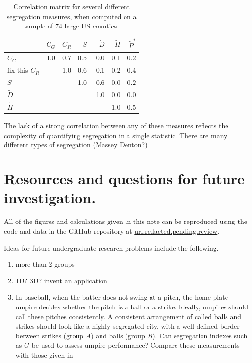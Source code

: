 \documentclass{article}
\theoremstyle{theorem}
\theoremstyle{definition}
\begin{document}
\begin{table}[b]
\centering
\begin{tabular}{l|rrrrrr} %
 & $C_G$ & $C_R$ & $S$ & $\tilde{D}$ &  $\tilde{H}$ & $\tilde{P}^*$ \\
  \hline
  $C_G$ & 1.0 & 0.7 & 0.5 & 0.0 & 0.1 & 0.2 \\ fix this
  $C_R$ &  & 1.0 & 0.6 & -0.1 & 0.2 & 0.4 \\
  $S$ &  &  & 1.0 & 0.6 &  0.0 & 0.2 \\
  $\tilde{D}$ &  &  &  & 1.0 & 0.0 & 0.0\\
  $\tilde{H}$ &  &  &  &  & 1.0 & 0.5 \\
\end{tabular}
\caption{Correlation matrix for several different segregation measures, when computed on a sample of 74 large US counties.}
\label{tab:indexcor}
\end{table}

The lack of a strong correlation between any of these measures reflects the complexity of quantifying segregation in a single statistic. There are many different types of segregation (Massey Denton?)

\section{Resources and questions for future investigation.}

All of the figures and calculations given in this note can be reproduced using the code and data in the GitHub repository at
\url{url.redacted.pending.review}.

Ideas for future undergraduate research problems include the following.

\begin{enumerate}
  \item more than 2 groups
  \item 1D? 3D? invent an application
  \item In baseball, when the batter does not swing at a pitch, the home plate umpire decides whether the pitch is a ball or a strike. Ideally, umpires should call these pitches consistently. A consistent arrangement of called balls and strikes should look like a highly-segregated city, with a well-defined border between strikes (group $A$) and balls (group $B$). Can segregation indexes such as $G$ be used to assess umpire performance? Compare these measurements with those given in \cite{hunter18}.

\end{enumerate}
\end{document}
